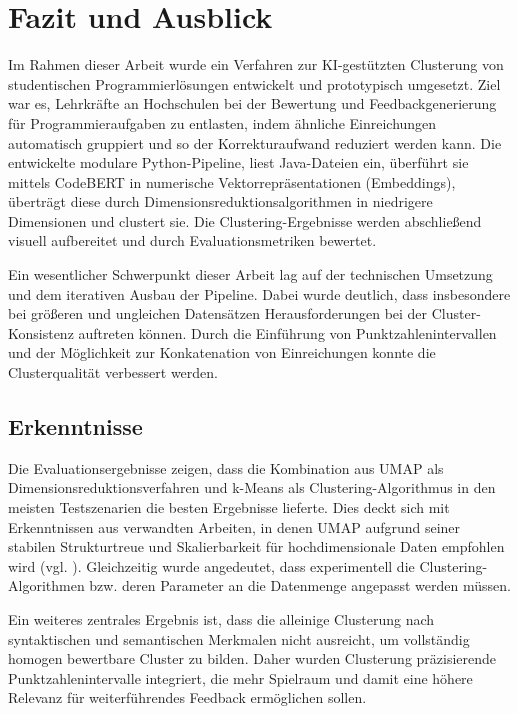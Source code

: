 \chapter{Fazit und Ausblick}

Im Rahmen dieser Arbeit wurde ein Verfahren zur KI-gestützten Clusterung von studentischen Programmierlösungen entwickelt und prototypisch umgesetzt. Ziel war es, Lehrkräfte an Hochschulen bei der Bewertung und Feedbackgenerierung für Programmieraufgaben zu entlasten, indem ähnliche Einreichungen automatisch gruppiert und so der Korrekturaufwand reduziert werden kann. Die entwickelte modulare Python-Pipeline, liest Java-Dateien ein, überführt sie mittels CodeBERT in numerische Vektorrepräsentationen (Embeddings), überträgt diese durch Dimensionsreduktionsalgorithmen in niedrigere Dimensionen und clustert sie. Die Clustering-Ergebnisse werden abschließend visuell aufbereitet und durch Evaluationsmetriken bewertet.

Ein wesentlicher Schwerpunkt dieser Arbeit lag auf der technischen Umsetzung und dem iterativen Ausbau der Pipeline. Dabei wurde deutlich, dass insbesondere bei größeren und ungleichen Datensätzen Herausforderungen bei der Cluster-Konsistenz auftreten können. Durch die Einführung von Punktzahlenintervallen und der Möglichkeit zur Konkatenation von Einreichungen konnte die Clusterqualität verbessert werden.

\section*{Erkenntnisse}
Die Evaluationsergebnisse zeigen, dass die Kombination aus UMAP als Dimensionsreduktionsverfahren und k-Means als Clustering-Algorithmus in den meisten Testszenarien die besten Ergebnisse lieferte. Dies deckt sich mit Erkenntnissen aus verwandten Arbeiten, in denen UMAP aufgrund seiner stabilen Strukturtreue und Skalierbarkeit für hochdimensionale Daten empfohlen wird (vgl. \cite{McInnes.09.02.2018}). Gleichzeitig wurde angedeutet, dass experimentell die Clustering-Algorithmen bzw. deren Parameter an die Datenmenge angepasst werden müssen.

Ein weiteres zentrales Ergebnis ist, dass die alleinige Clusterung nach syntaktischen und semantischen Merkmalen nicht ausreicht, um vollständig homogen bewertbare Cluster zu bilden. Daher wurden Clusterung präzisierende Punktzahlenintervalle integriert, die mehr Spielraum und damit eine höhere Relevanz für weiterführendes Feedback ermöglichen sollen.

